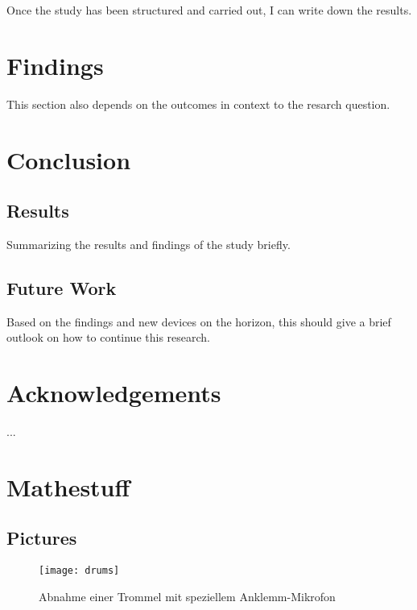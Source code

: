         Once the study has been structured and carried out, I can write down the results.

    \chapter{Findings}

        This section also depends on the outcomes in context to the resarch question.

    \chapter{Conclusion}

        \section{Results}

            Summarizing the results and findings of the study briefly.

        \section{Future Work}

            Based on the findings and new devices on the horizon, this should give a brief outlook on how to continue this research.

    \chapter{Acknowledgements}

        ...




    \chapter{Mathestuff}

        \section{Pictures}

            \begin{figure}[htp]     %
                \centering
                \texttt{[image: drums]} 
                \caption{Abnahme einer Trommel mit speziellem Anklemm-Mikrofon}\label{trommelmik}
                \end{figure}
    
